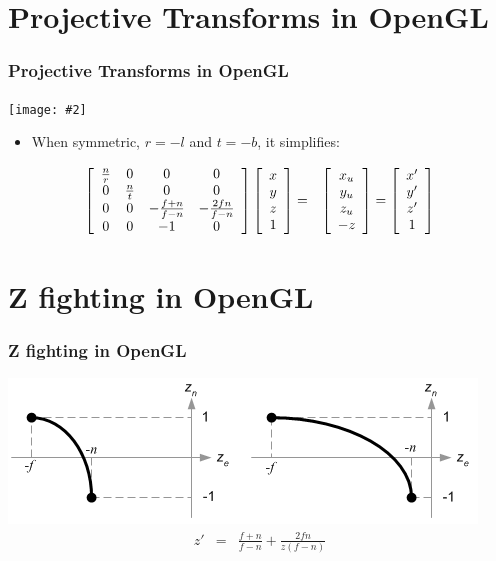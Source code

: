 \documentclass[slidestop,xcolor=pst]{beamer}
\newcommand{\graphc}[2]{\centerline{\texttt{[image: \#2]}}}
\newcommand{\sect}[1]{
\section{#1}
\begin{frame}[fragile]\frametitle{#1}
}
\begin{document}
\sect{Projective Transforms in OpenGL}
\graphc{.8}{gl_projectionmatrix01.png}
\begin{itemize}
\item When symmetric, $r=-l$ and $t=-b$, it simplifies:
\end{itemize}
\begin{eqnarray*}
\left[\begin{array}{cccc} \frac{n}{r}& 0 & 0& 0 \\ 0 & \frac{n}{t}&0& 0 \\ 0&0& -\frac{f+n}{f-n}& -\frac{2fn}{f-n} \\ 0&0&-1&0\end{array}\right]
\left[\begin{array}{c} x\\y\\z \\ 1\end{array}\right]
&=&\left[\begin{array}{c} x_u\\y_u\\z_u\\-z \end{array}\right]
=\left[\begin{array}{c} x'\\y'\\z' \\ 1\end{array}\right]
  \end{eqnarray*}
\end{frame}


\sect{Z fighting in OpenGL}
\includegraphics[width=\textwidth]{gl_projectionmatrix07.png}
\begin{eqnarray*}
z' &=& \frac{f+n}{f-n} + \frac{2fn}{z(f-n)}
\end{eqnarray*}
\end{frame}
\end{document}

